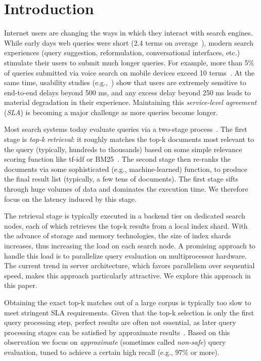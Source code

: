 \section{Introduction}
\label{sec:intro}

Internet users are changing the ways in which they interact with search engines. 
While  early days web queries were short (2.4 terms on average~\cite{Spink:2001:SWP:362968.362979}), 
modern search experiences (query suggestion, reformulation, conversational interfaces, etc.) stimulate their users to submit much longer queries. 
For example, more than 5\% of queries submitted via voice search on mobile devices exceed 10 terms~\cite{sigir/Guy16}. 
At the same time, usability studies
(e.g.,~\cite{Arapakis:2014:IRL:2600428.2609627}) show that users are extremely sensitive to end-to-end delays beyond 500 ms, 
and any excess delay beyond 250 ms leads to material degradation in their experience. Maintaining this \emph{service-level agreement} ({\em SLA}) 
is becoming a major challenge as more queries become longer.

 Most search systems today evaluate queries via a two-stage process~\cite{Wang:2011}. 
The first stage is \emph{top-k retrieval}: it 
 roughly matches the top-k documents most relevant to the query (typically, hundreds to thousands) based on some simple relevance scoring function like tf-idf or BM25~\cite{Baeza-Yates:1999:MIR:553876}. The second stage then re-ranks the  documents via some sophisticated (e.g., machine-learned) function, to produce the final result list (typically, a few tens of documents). 
The first stage  sifts through huge volumes of data and dominates the execution time. 
We therefore focus on the latency induced by this stage. 

The retrieval stage is typically executed in a backend  tier on dedicated search nodes, each of which retrieves the top-k results from a local index shard. 
With the advance of storage and memory technologies, the size of index shards increases, thus increasing the load on each search node. 
A promising approach to handle this load is to  parallelize query evaluation on multiprocessor hardware. 
The current trend in server architecture, which favors parallelism over sequential speed, makes this approach particularly attractive. 
We explore this approach in this paper.


Obtaining the exact top-k matches out of a large corpus is typically too slow to meet stringent SLA requirements. 
Given that the top-k selection is only the first query  processing step, perfect results are often not essential, as later query processing 
stages can be satisfied by approximate results~\cite{Crane:2017,Lin:2015,Wang:2011}. 
Based on this observation we focus on \emph{approximate} 
(sometimes called \emph{non-safe}) query evaluation, tuned to achieve a certain high recall (e.g., $97\%$ or more). 

